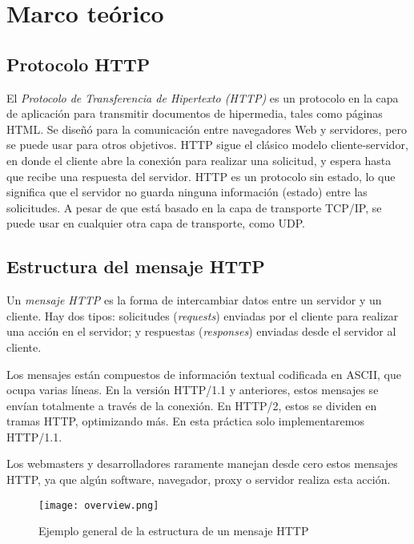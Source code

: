 \documentclass[15pt]{article}
\begin{document}
	\maketitle

	\section{Marco teórico}
		\subsection{Protocolo HTTP}
			El \emph{Protocolo de Transferencia de Hipertexto (HTTP)} es un protocolo en la capa de aplicación para transmitir documentos de hipermedia, tales como páginas HTML. Se diseñó para la comunicación entre navegadores Web y servidores, pero se puede usar para otros objetivos. HTTP sigue el clásico modelo cliente-servidor, en donde el cliente abre la conexión para realizar una solicitud, y espera hasta que recibe una respuesta del servidor. HTTP es un protocolo sin estado, lo que significa que el servidor no guarda ninguna información (estado) entre las solicitudes. A pesar de que está basado en la capa de transporte TCP/IP, se puede usar en cualquier otra capa de transporte, como UDP.
		
		\subsection{Estructura del mensaje HTTP}
			Un \emph{mensaje HTTP} es la forma de intercambiar datos entre un servidor y un cliente. Hay dos tipos: solicitudes (\emph{requests}) enviadas por el cliente para realizar una acción en el servidor; y respuestas (\emph{responses}) enviadas desde el servidor al cliente.
			
			Los mensajes están compuestos de información textual codificada en ASCII, que ocupa varias líneas. En la versión HTTP/1.1 y anteriores, estos mensajes se envían totalmente a través de la conexión. En HTTP/2, estos se dividen en tramas HTTP, optimizando más. En esta práctica solo implementaremos HTTP/1.1.
			
			Los webmasters y desarrolladores raramente manejan desde cero estos mensajes HTTP, ya que algún software, navegador, proxy o servidor realiza esta acción.
			
			\begin{figure}[H]
				\centering
				\texttt{[image: overview.png]}
				\caption{Ejemplo general de la estructura de un mensaje HTTP}
			\end{figure}
			
\end{document}
